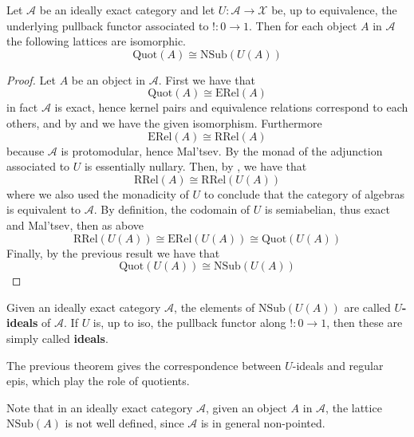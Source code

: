 \begin{mainbox}{}
\begin{theo}\label{quotients in ideally exact}
    Let $\mathcal{A}$ be an ideally exact category and let $U:\mathcal{A} \to \mathcal{X}$ be, up to equivalence, the underlying pullback functor associated to $! : 0 \to 1$. Then for each object $A$ in $\mathcal{A}$ the following lattices are isomorphic.
    \[\mathrm{Quot}(A) \cong \mathrm{NSub}(U(A))\]
\end{theo}
\end{mainbox}

\begin{subbox}{}
    \begin{proof}
        Let $A$ be an object in $\mathcal{A}$. First we have that
        \[\mathrm{Quot}(A) \cong \mathrm{ERel}(A)\]
        in fact $\mathcal{A}$ is exact, hence kernel pairs and equivalence relations correspond to each others, and by  and  we have the given isomorphism. Furthermore
        \[\mathrm{ERel}(A) \cong \mathrm{RRel}(A)\]
        because $\mathcal{A}$ is protomodular, hence Mal'tsev. By  the monad of the adjunction associated to $U$ is essentially nullary. Then, by , we have that
        \[\mathrm{RRel}(A)\cong \mathrm{RRel}(U(A)) \]
        where we also used the monadicity of $U$ to conclude that the category of algebras is equivalent to $\mathcal{A}$.
        By definition, the codomain of $U$ is semiabelian, thus exact and Mal'tsev, then as above 
        \[\mathrm{RRel}(U(A)) \cong \mathrm{ERel}(U(A)) \cong \mathrm{Quot}(U(A))\]
        Finally, by the previous result  we have that
        \[\mathrm{Quot}(U(A)) \cong \mathrm{NSub}(U(A))\]
    \end{proof}
\end{subbox}

Given an ideally exact category $\mathcal{A}$, the elements of $\mathrm{NSub}(U(A))$ are called $U$\textbf{-ideals} of $\mathcal{A}$. If $U$ is, up to iso, the pullback functor along $! : 0 \to 1$, then these are simply called \textbf{ideals}.

The previous theorem gives the correspondence between $U$-ideals and regular epis, which play the role of quotients.

\begin{rembox}{}
    \begin{rem}
        Note that in an ideally exact category $\mathcal{A}$, given an object $A$ in $\mathcal{A}$, the lattice $\mathrm{NSub}(A)$ is not well defined, since $\mathcal{A}$ is in general non-pointed.
    \end{rem}
\end{rembox}


